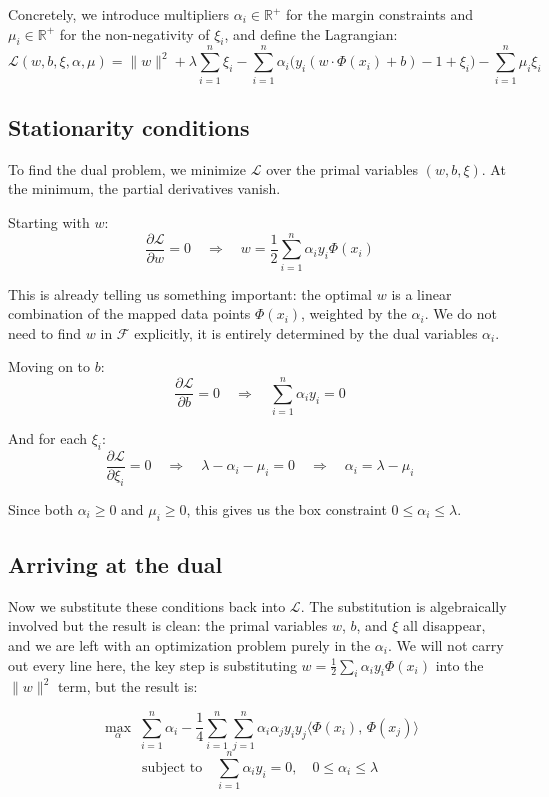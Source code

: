 \documentclass[12pt,a4paper]{article}
\begin{document}
Concretely, we introduce multipliers $\alpha_i \in \mathbb{R}^+$ for the margin
constraints and $\mu_i \in \mathbb{R}^+$ for the non-negativity of $\xi_i$, and
define the Lagrangian:
\[
\mathcal{L}(w,b,\xi,\alpha,\mu)
= \|w\|^2 + \lambda\sum_{i=1}^n \xi_i
- \sum_{i=1}^n \alpha_i\bigl(y_i(w \cdot \Phi(x_i) + b) - 1 + \xi_i\bigr)
- \sum_{i=1}^n \mu_i \xi_i
\]

\subsection{Stationarity conditions}

To find the dual problem, we minimize $\mathcal{L}$ over the primal
variables $(w, b, \xi)$. At the minimum, the partial derivatives vanish.

Starting with $w$:
\[
\frac{\partial \mathcal{L}}{\partial w} = 0
\quad \Rightarrow \quad
w = \frac{1}{2}\sum_{i=1}^n \alpha_i y_i \Phi(x_i)
\]

This is already telling us something important: the optimal $w$ is a linear
combination of the mapped data points $\Phi(x_i)$, weighted by the $\alpha_i$.
We do not need to find $w$ in $\mathcal{F}$ explicitly, it is entirely
determined by the dual variables $\alpha_i$.

Moving on to $b$:
\[
\frac{\partial \mathcal{L}}{\partial b} = 0
\quad \Rightarrow \quad
\sum_{i=1}^n \alpha_i y_i = 0
\]

And for each $\xi_i$:
\[
\frac{\partial \mathcal{L}}{\partial \xi_i} = 0
\quad \Rightarrow \quad
\lambda - \alpha_i - \mu_i = 0
\quad \Rightarrow \quad
\alpha_i = \lambda - \mu_i
\]

Since both $\alpha_i \geq 0$ and $\mu_i \geq 0$, this gives us the box
constraint $0 \leq \alpha_i \leq \lambda$.

\subsection{Arriving at the dual}

Now we substitute these conditions back into $\mathcal{L}$. The substitution
is algebraically involved but the result is clean: the primal variables $w$,
$b$, and $\xi$ all disappear, and we are left with an optimization problem
purely in the $\alpha_i$. We will not carry out every line here, the key
step is substituting $w = \frac{1}{2}\sum_i \alpha_i y_i \Phi(x_i)$ into
the $\|w\|^2$ term, but the result is:

\[
\max_{\alpha}\;
\sum_{i=1}^n \alpha_i
- \frac{1}{4}
\sum_{i=1}^n \sum_{j=1}^n
\alpha_i \alpha_j y_i y_j
\langle \Phi(x_i),\, \Phi(x_j) \rangle
\]
\[
\text{subject to} \quad
\sum_{i=1}^n \alpha_i y_i = 0,
\quad
0 \leq \alpha_i \leq \lambda
\]
\end{document}

